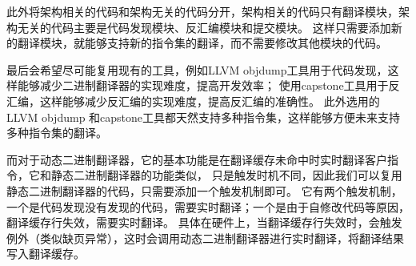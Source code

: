 此外将架构相关的代码和架构无关的代码分开，架构相关的代码只有翻译模块，架构无关的代码主要是代码发现模块、反汇编模块和提交模块。
这样只需要添加新的翻译模块，就能够支持新的指令集的翻译，而不需要修改其他模块的代码。

最后会希望尽可能复用现有的工具，例如LLVM objdump工具用于代码发现，这样能够减少二进制翻译器的实现难度，提高开发效率；
使用capstone工具用于反汇编，这样能够减少反汇编的实现难度，提高反汇编的准确性。
此外选用的LLVM objdump 和capstone工具都天然支持多种指令集，这样能够方便未来支持多种指令集的翻译。


而对于动态二进制翻译器，它的基本功能是在翻译缓存未命中时实时翻译客户指令，它和静态二进制翻译器的功能类似，
只是触发时机不同，因此我们可以复用静态二进制翻译器的代码，只需要添加一个触发机制即可。
它有两个触发机制，一个是代码发现没有发现的代码，需要实时翻译；一个是由于自修改代码等原因，翻译缓存行失效，需要实时翻译。
具体在硬件上，当翻译缓存行失效时，会触发例外（类似缺页异常），这时会调用动态二进制翻译器进行实时翻译，将翻译结果写入翻译缓存。





